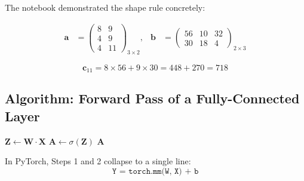 \documentclass[12pt,a4paper]{article}
\begin{document}
The notebook demonstrated the shape rule concretely:

\begin{align}
  \mathbf{a} &= \begin{pmatrix} 8 & 9 \\ 4 & 9 \\ 4 & 11 \end{pmatrix}_{3\times 2},
  &
  \mathbf{b} &= \begin{pmatrix} 56 & 10 & 32 \\ 30 & 18 & 4 \end{pmatrix}_{2\times 3}
  \label{eq:example-ab}
\end{align}

\begin{equation}
  \mathbf{c}_{11} = 8 \times 56 + 9 \times 30 = 448 + 270 = 718
  \label{eq:c11}
\end{equation}

\subsection{Algorithm: Forward Pass of a Fully-Connected Layer}
\label{subsec:algorithm}

\begin{algorithm}[H]
  \caption{Forward Pass --- Single Fully-Connected Layer}
  \label{alg:forward}
  \DontPrintSemicolon
  \BlankLine
  $\mathbf{Z} \leftarrow \mathbf{W} \cdot \mathbf{X}$
  \BlankLine
  \BlankLine
  $\mathbf{A} \leftarrow \sigma(\mathbf{Z})$
  \BlankLine
  \Return $\mathbf{A}$
\end{algorithm}

In PyTorch, Steps 1 and 2 collapse to a single line:
\begin{equation}
  \label{eq:torch-linear}
  \texttt{Y = torch.mm(W, X) + b}
\end{equation}
\end{document}
